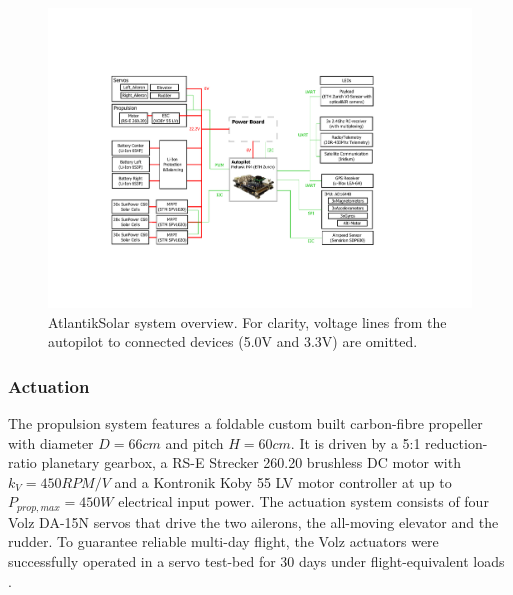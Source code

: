 \begin{figure}[tb]
    \centering
     \includegraphics[width=\linewidth]{images/8_AtlantikSolar_Avionics}
    \caption{AtlantikSolar system overview. For clarity, voltage lines from the autopilot to connected devices (5.0V and 3.3V) are omitted.}
    \label{fig:AtlantikSolar_SystemOverview}
\end{figure}

\subsubsection{Actuation}
The propulsion system features a foldable custom built carbon-fibre propeller with diameter $D=66cm$ and pitch $H=60cm$. It is driven by a 5:1 reduction-ratio planetary gearbox, a RS-E Strecker 260.20 brushless DC motor with $k_V=450RPM/V$ and a Kontronik Koby 55 LV motor controller at up to $P_{prop,max}=450W$ electrical input power. The actuation system consists of four Volz DA-15N servos that drive the two ailerons, the all-moving elevator and the rudder. To guarantee reliable multi-day flight, the Volz actuators were successfully operated in a servo test-bed for 30 days under flight-equivalent loads \cite{DellaCa_BT}.

